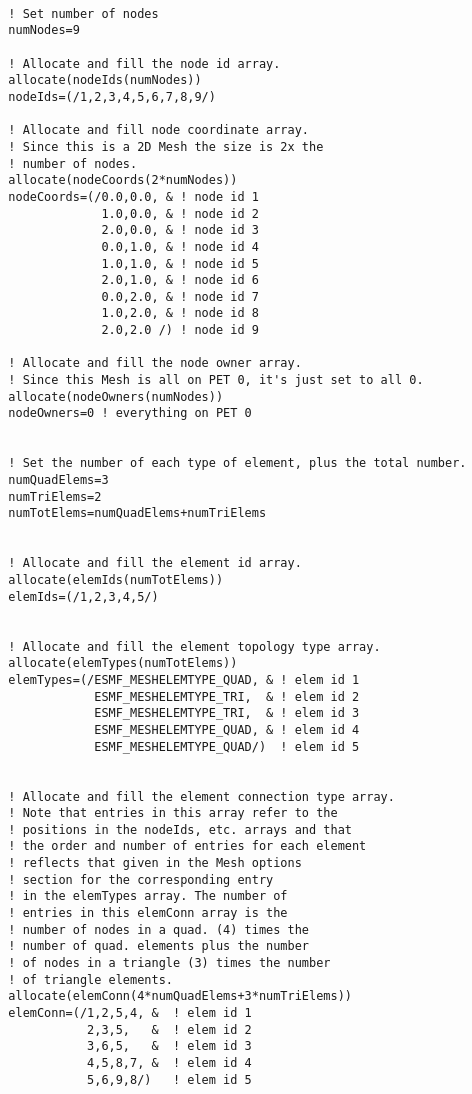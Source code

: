  \begin{verbatim}

  ! Set number of nodes
  numNodes=9

  ! Allocate and fill the node id array.
  allocate(nodeIds(numNodes))
  nodeIds=(/1,2,3,4,5,6,7,8,9/) 

  ! Allocate and fill node coordinate array.
  ! Since this is a 2D Mesh the size is 2x the
  ! number of nodes.
  allocate(nodeCoords(2*numNodes))
  nodeCoords=(/0.0,0.0, & ! node id 1
               1.0,0.0, & ! node id 2
               2.0,0.0, & ! node id 3
               0.0,1.0, & ! node id 4
               1.0,1.0, & ! node id 5
               2.0,1.0, & ! node id 6
               0.0,2.0, & ! node id 7
               1.0,2.0, & ! node id 8
               2.0,2.0 /) ! node id 9

  ! Allocate and fill the node owner array.
  ! Since this Mesh is all on PET 0, it's just set to all 0.
  allocate(nodeOwners(numNodes))
  nodeOwners=0 ! everything on PET 0


  ! Set the number of each type of element, plus the total number.
  numQuadElems=3
  numTriElems=2
  numTotElems=numQuadElems+numTriElems


  ! Allocate and fill the element id array.
  allocate(elemIds(numTotElems))
  elemIds=(/1,2,3,4,5/) 


  ! Allocate and fill the element topology type array.
  allocate(elemTypes(numTotElems))
  elemTypes=(/ESMF_MESHELEMTYPE_QUAD, & ! elem id 1
              ESMF_MESHELEMTYPE_TRI,  & ! elem id 2
              ESMF_MESHELEMTYPE_TRI,  & ! elem id 3
              ESMF_MESHELEMTYPE_QUAD, & ! elem id 4
              ESMF_MESHELEMTYPE_QUAD/)  ! elem id 5


  ! Allocate and fill the element connection type array.
  ! Note that entries in this array refer to the 
  ! positions in the nodeIds, etc. arrays and that
  ! the order and number of entries for each element
  ! reflects that given in the Mesh options 
  ! section for the corresponding entry
  ! in the elemTypes array. The number of 
  ! entries in this elemConn array is the
  ! number of nodes in a quad. (4) times the 
  ! number of quad. elements plus the number
  ! of nodes in a triangle (3) times the number
  ! of triangle elements. 
  allocate(elemConn(4*numQuadElems+3*numTriElems))
  elemConn=(/1,2,5,4, &  ! elem id 1
             2,3,5,   &  ! elem id 2
             3,6,5,   &  ! elem id 3
             4,5,8,7, &  ! elem id 4
             5,6,9,8/)   ! elem id 5



\end{verbatim}
